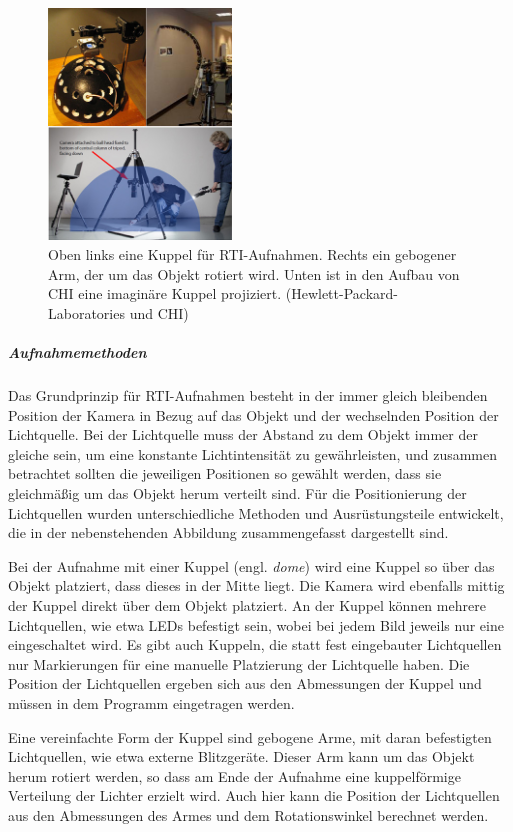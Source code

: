 \begin{figure}
  \begin{center} \vspace{-0.6cm}
    \includegraphics[width=0.435\textwidth]{bilder/rti_aufnahme}
  \end{center}
  \caption{Oben links eine Kuppel für RTI-Aufnahmen. Rechts ein gebogener Arm, der um das Objekt rotiert wird. Unten ist in den Aufbau von CHI eine imaginäre Kuppel projiziert. (Hewlett-Packard-Laboratories und CHI)}
\end{figure} 
\subparagraph{Aufnahmemethoden}
Das Grundprinzip für RTI-Aufnahmen besteht in der immer gleich bleibenden Position der Kamera in Bezug auf das Objekt und der wechselnden Position der Lichtquelle. Bei der Lichtquelle muss der Abstand zu dem Objekt immer der gleiche sein, um eine konstante Lichtintensität zu gewährleisten, und zusammen betrachtet sollten die jeweiligen Positionen so gewählt werden, dass sie gleichmäßig um das Objekt herum verteilt sind. Für die Positionierung der Lichtquellen wurden unterschiedliche Methoden und Ausrüstungsteile entwickelt, die in der nebenstehenden Abbildung zusammengefasst dargestellt sind.

Bei der Aufnahme mit einer Kuppel (engl. \emph{dome}) wird eine Kuppel so über das Objekt platziert, dass dieses in der Mitte liegt. Die Kamera wird ebenfalls mittig der Kuppel direkt über dem Objekt platziert. An der Kuppel können mehrere Lichtquellen, wie etwa LEDs befestigt sein, wobei bei jedem Bild jeweils nur eine eingeschaltet wird. Es gibt auch Kuppeln, die statt fest eingebauter Lichtquellen nur Markierungen für eine manuelle Platzierung der Lichtquelle haben. Die Position der Lichtquellen ergeben sich aus den Abmessungen der Kuppel und müssen in dem Programm eingetragen werden.

Eine vereinfachte Form der Kuppel sind gebogene Arme, mit daran befestigten Lichtquellen, wie etwa externe Blitzgeräte. Dieser Arm kann um das Objekt herum rotiert werden, so dass am Ende der Aufnahme eine kuppelförmige Verteilung der Lichter erzielt wird. Auch hier kann die Position der Lichtquellen aus den Abmessungen des Armes und dem Rotationswinkel berechnet werden.

